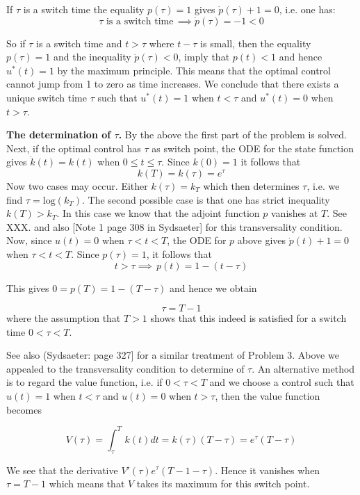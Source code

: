 \documentclass{amsart}
\begin{document}
\noindent
If $\tau$ is a switch time the equality
$p(\tau)=1$  gives $\dot p(\tau)+1=0$, i.e. one has:
\[
\tau \,\,\text{is a switch time}\,\implies
\dot p(\tau)=-1<0
\]

\noindent
So if $\tau$ is a switch time and $t>\tau$ where $t-\tau$ is small, then
the equality $p(\tau)=1$ and the inequality $\dot p(\tau)<0$, imply that
$p(t)<1$ and hence $u^*(t)=1$ by  the maximum principle.
This means that the optimal control cannot jump from 1 to zero as time increases.
We conclude that there exists a unique switch time $\tau$ such that $u^*(t)=1$
when $t<\tau$ and $u^*(t)=0$ when $t>\tau$.
 


\medskip

\noindent
{\bf The determination of $\tau$.} By the above the first part of the problem is solved.
Next, if the optimal control has $\tau$ as switch point, the ODE for the state function gives $\dot k(t)=k(t)$ when $0\leq t\leq\tau$. Since $k(0)=1$ it follows that 
\[
k(T)=k(\tau)=e^\tau
\]
Now two cases may occur. Either $k(\tau)=k_T$ which
then determines $\tau$, i.e. we find $\tau=\text{log}(k_T)$.
The second possible case is that one has strict inequality $k(T)>k_T$.
In this case we know that the adjoint function $p$ vanishes
at $T$. See XXX.
and also [Note 1 page 308 in Sydsaeter]
for this transversality condition.
Now, since $u(t)=0$ when $\tau<t<T$, the ODE for $p$ above gives
$\dot p(t)+1=0$ when $\tau<t<T$. Since $p(\tau)=1$, it follows that
\[
t >\tau\implies\,p(t)=1-(t-\tau)
\]

\noindent
This gives $0=p(T)=1-(T-\tau)$ and hence we obtain

\[
\tau=T-1\tag{*}
\]
where the assumption that $T>1$ shows that this indeed 
is satisfied for a switch time $0<\tau<T$.
\medskip

 See also (Sydsaeter: page 327]  for a similar 
treatment of Problem 3.
Above we appealed to the transversality condition to
determine of $\tau$.
An alternative method  is to regard the value function, i.e. if 
$0<\tau<T$ and we choose a control
such that $u(t)=1$ when $t<\tau$ and $u(t)=0$ when $t>\tau$, then
the value function becomes

\[
V(\tau)=\int_\tau^T\,k(t)dt= k(\tau)(T-\tau)=
e^\tau(T-\tau)
\]

\noindent
We see that the derivative $V'(\tau)e^\tau(T-1-\tau)$. Hence 
it vanishes when $\tau=T-1$ which means that $V$ takes its maximum for this
switch point.
\end{document}
